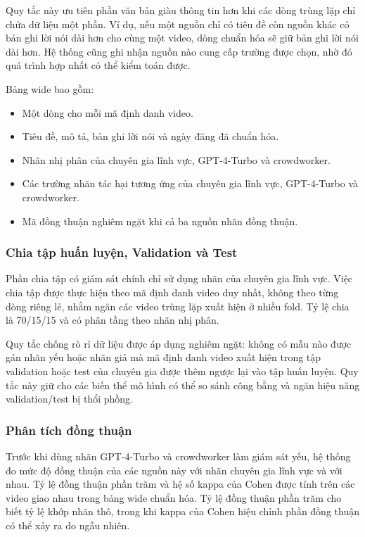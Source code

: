 Quy tắc này ưu tiên phần văn bản giàu thông tin hơn khi các dòng trùng lặp chỉ chứa dữ liệu một phần. Ví dụ, nếu một nguồn chỉ có tiêu đề còn nguồn khác có bản ghi lời nói dài hơn cho cùng một video, dòng chuẩn hóa sẽ giữ bản ghi lời nói dài hơn. Hệ thống cũng ghi nhận nguồn nào cung cấp trường được chọn, nhờ đó quá trình hợp nhất có thể kiểm toán được.

Bảng wide bao gồm:

\begin{itemize}
    \item Một dòng cho mỗi mã định danh video.
    \item Tiêu đề, mô tả, bản ghi lời nói và ngày đăng đã chuẩn hóa.
    \item Nhãn nhị phân của chuyên gia lĩnh vực, GPT-4-Turbo và crowdworker.
    \item Các trường nhãn tác hại tương ứng của chuyên gia lĩnh vực, GPT-4-Turbo và crowdworker.
    \item Mã đồng thuận nghiêm ngặt khi cả ba nguồn nhãn đồng thuận.
\end{itemize}

\subsubsection{Chia tập huấn luyện, Validation và Test}

Phần chia tập có giám sát chính chỉ sử dụng nhãn của chuyên gia lĩnh vực. Việc chia tập được thực hiện theo mã định danh video duy nhất, không theo từng dòng riêng lẻ, nhằm ngăn các video trùng lặp xuất hiện ở nhiều fold. Tỷ lệ chia là 70/15/15 và có phân tầng theo nhãn nhị phân.

Quy tắc chống rò rỉ dữ liệu được áp dụng nghiêm ngặt: không có mẫu nào được gán nhãn yếu hoặc nhãn giả mà mã định danh video xuất hiện trong tập validation hoặc test của chuyên gia được thêm ngược lại vào tập huấn luyện. Quy tắc này giữ cho các biến thể mô hình có thể so sánh công bằng và ngăn hiệu năng validation/test bị thổi phồng.

\subsubsection{Phân tích đồng thuận}

Trước khi dùng nhãn GPT-4-Turbo và crowdworker làm giám sát yếu, hệ thống đo mức độ đồng thuận của các nguồn này với nhãn chuyên gia lĩnh vực và với nhau. Tỷ lệ đồng thuận phần trăm và hệ số kappa của Cohen được tính trên các video giao nhau trong bảng wide chuẩn hóa. Tỷ lệ đồng thuận phần trăm cho biết tỷ lệ khớp nhãn thô, trong khi kappa của Cohen hiệu chỉnh phần đồng thuận có thể xảy ra do ngẫu nhiên.

